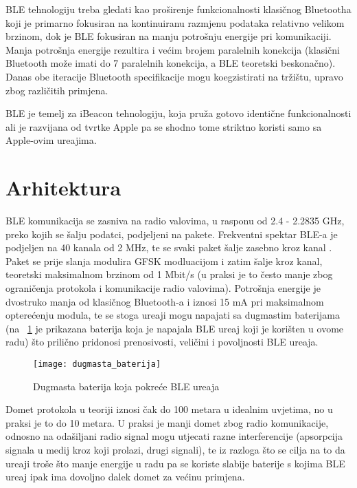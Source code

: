 BLE tehnologiju treba gledati kao pro\v{s}irenje funkcionalnosti klasi\v{c}nog Bluetootha koji je primarno fokusiran na kontinuiranu razmjenu podataka relativno velikom brzinom, dok je BLE fokusiran na manju potro\v{s}nju energije pri komunikaciji. Manja potro\v{s}nja energije rezultira i ve\'{c}im brojem paralelnih konekcija (klasi\v{c}ni Bluetooth mo\v{z}e imati do 7 paralelnih konekcija, a BLE teoretski beskona\v{c}no). Danas obe iteracije Bluetooth specifikacije mogu koegzistirati na tr\v{z}i\v{s}tu, upravo zbog razli\v{c}itih primjena.

BLE je temelj za iBeacon tehnologiju, koja pru\v{z}a gotovo identi\v{c}ne funkcionalnosti ali je razvijana od tvrtke Apple pa se shodno tome striktno koristi samo sa Apple-ovim ure\dj ajima.

\section{Arhitektura}

BLE komunikacija se zasniva na radio valovima, u rasponu od 2.4 - 2.2835 GHz, preko kojih se \v{s}alju podatci, podjeljeni na pakete. Frekventni spektar BLE-a je podjeljen na 40 kanala od 2 MHz, te se svaki paket \v{s}alje zasebno kroz kanal \cite{ble_introduction}. Paket se prije slanja modulira GFSK modluacijom i zatim \v{s}alje kroz kanal, teoretski maksimalnom brzinom od 1 Mbit/s (u praksi je to \v{c}esto manje zbog ograni\v{c}enja protokola i komunikacije radio valovima). Potro\v{s}nja energije je dvostruko manja od klasi\v{c}nog Bluetooth-a i iznosi 15 mA pri maksimalnom optere\'{c}enju modula, te se stoga ure\dj aji mogu napajati sa dugmastim baterijama (na ~\ref{fig:ble_baterija} je prikazana baterija koja je napajala BLE ure\dj aj koji je kori\v{s}ten u ovome radu) \v{s}to prili\v{c}no pridonosi prenosivosti, veli\v{c}ini i povoljnosti BLE ure\dj aja.


\begin{figure}[!htbp]
	\begin{center}
 \texttt{[image: dugmasta\_baterija]}
 \caption{Dugmasta baterija koja pokre\'{c}e BLE ure\dj aja}
 \label{fig:ble_baterija}
	\end{center}
\end{figure}

Domet protokola u teoriji iznosi \v{c}ak do 100 metara u idealnim uvjetima, no u praksi je to do 10 metara. U praksi je manji domet zbog radio komunikacije, odnosno na oda\v{s}iljani radio signal mogu utjecati razne interferencije (apsorpcija signala u medij kroz koji prolazi, drugi signali), te iz razloga \v{s}to se cilja na to da ure\dj aji tro\v{s}e \v{s}to manje energije u radu pa se koriste slabije baterije s kojima BLE ure\dj aj ipak ima dovoljno dalek domet za ve\'{c}inu primjena.


